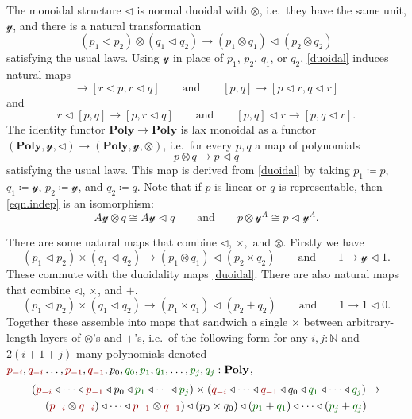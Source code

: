 \documentclass[11pt, one side, article]{memoir}
\newcommand{\myred}[1]{{\color{red!60!black}#1}}
\newcommand{\mygreen}[1]{{\color{green!40!black}#1}}
\theoremstyle{definition}
\theoremstyle{plain}
\newcommand{\Cat}[1]{\mathbf{#1}}%
\newcommand{\too}{\longrightarrow}
\newcommand{\nn}{\mathbb{N}}
\newcommand{\yon}{\mathcal{y}}
\newcommand{\poly}{\Cat{Poly}}
\newcommand{\0}{\textsf{0}}
\newcommand{\1}{\tn{\textsf{1}}}
\newcommand{\tri}{\mathbin{\triangleleft}}
\newcommand{\qqand}{\qquad\text{and}\qquad}
\begin{document}
The monoidal structure $\tri$ is normal duoidal with $\otimes$, i.e.\ they have the same unit, $\yon$, and there is a natural transformation
\begin{equation}\label{duoidal}
	(p_1\tri p_2)\otimes(q_1\tri q_2)\too(p_1\otimes q_1)\tri(p_2\otimes q_2)
\end{equation}
satisfying the usual laws. Using $\yon$ in place of $p_1$, $p_2$, $q_1$, or $q_2$, \eqref{duoidal} induces natural maps
\begin{equation}
	[p,q]\to[r\tri p, r\tri q]
	\qqand
	[p,q]\to[p\tri r, q\tri r]
\end{equation}
and
\begin{equation}
	r\tri[p,q]\to[p,r\tri q]
	\qqand
	[p,q]\tri r\to [p,q\tri r].
\end{equation}
The identity functor $\poly\to\poly$ is lax monoidal as a functor $(\poly,\yon,\tri)\to(\poly,\yon,\otimes)$, i.e.\ for every $p,q$ a map of polynomials
\begin{equation}\label{eqn.indep}
	p\otimes q\to p\tri q
\end{equation}
satisfying the usual laws. This map is derived from \eqref{duoidal} by taking $p_1\coloneqq p$, $q_1\coloneqq\yon$, $p_2\coloneqq\yon$, and $q_2\coloneqq q$. Note that if $p$ is linear or $q$ is representable, then \eqref{eqn.indep} is an isomorphism:
\begin{equation}
  A\yon\otimes q\cong A\yon\tri q
  \qqand
  p\otimes\yon^A\cong p\tri \yon^A.
\end{equation}


There are some natural maps that combine $\tri$, $\times,$ and $\otimes$. Firstly we have
\begin{equation}
	(p_1\tri p_2)\times(q_1\tri q_2)\to (p_1\otimes q_1)\tri (p_2\times q_2)
	\qqand
	1\to\yon\tri 1.
\end{equation}
These commute with the duoidality maps \eqref{duoidal}. There are also natural maps that combine $\tri$, $\times$, and $+$.
\[
	(p_1\tri p_2)\times (q_1\tri q_2)\to (p_1\times q_1)\tri(p_2+q_2)
	\qqand
	1\to1\tri 0.
\]
Together these assemble into maps that sandwich a single $\times$ between arbitrary-length layers of $\otimes$'s and $+$'s, i.e.\ of the following form for any $i,j:\nn$ and $2(i+1+j)$-many polynomials denoted $\myred{p_{-i}},\myred{q_{-i}}\ldots,\myred{p_{-1}},\myred{q_{-1}},p_0,\mygreen{q_0}
,\mygreen{p_1},\mygreen{q_1},\ldots,\mygreen{p_j},\mygreen{q_j}:\poly$,
\begin{multline}
	(\myred{p_{-i}}\tri\cdots\tri \myred{p_{-1}}\tri p_0\tri \mygreen{p_1}\tri\cdots\tri \mygreen{p_j})
	\times
	(\myred{q_{-i}}\tri\cdots\tri \myred{q_{-1}}\tri q_0\tri \mygreen{q_1}\tri\cdots\tri \mygreen{q_j})
	\to\\
	(\myred{p_{-i}}\otimes \myred{q_{-i}})\tri\cdots\tri\myred{p_{-1}}\otimes \myred{q_{-1}})\tri(p_0\times q_0)\tri(\mygreen{p_1}+\mygreen{q_1})\tri\cdots\tri(\mygreen{p_j}+\mygreen{q_j})
\end{multline}
\end{document}
